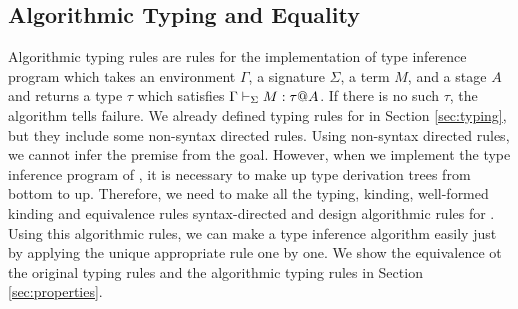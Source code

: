 \subsection{Algorithmic Typing and Equality}


Algorithmic typing rules are rules for the implementation of type inference
program which takes an environment \( \Gamma \), a signature \( \Sigma \), a
term \( M \), and a stage \( A \) and returns a type \( \tau \) which satisfies
\( \Gamma \vdash_\Sigma M : \tau @ A \). If there is no such \( \tau \), the algorithm tells
failure.  We already defined typing rules for \LMD in Section \ref{sec:typing},
but they include some non-syntax directed rules. Using non-syntax directed
rules, we cannot infer the premise from the goal. However, when we implement
the type inference program of \LMD, it is necessary to make up type derivation
trees from bottom to up.  Therefore, we need to make all the typing, kinding,
well-formed kinding and equivalence rules syntax-directed and design
algorithmic rules for \LMD. Using this algorithmic rules, we can
make a type inference algorithm easily just by applying the unique appropriate
rule one by one. We show the equivalence ot the original typing rules and the
algorithmic typing rules in Section \ref{sec:properties}.




